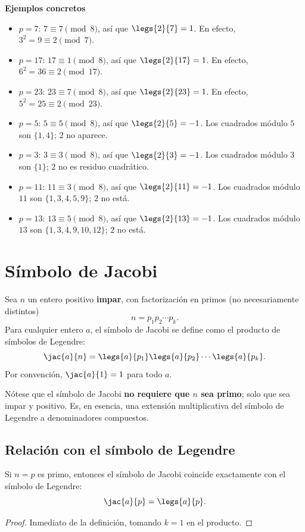 \noindent\textbf{Ejemplos concretos}

\begin{itemize}
  \item $p = 7$: $7 \equiv 7 \pmod 8$, así que $\legs{2}{7} = 1$. En efecto, $3^2 = 9 \equiv 2 \pmod 7$.
  \item $p = 17$: $17 \equiv 1 \pmod 8$, así que $\legs{2}{17} = 1$. En efecto, $6^2 = 36 \equiv 2 \pmod{17}$.
  \item $p = 23$: $23 \equiv 7 \pmod 8$, así que $\legs{2}{23} = 1$. En efecto, $5^2 = 25 \equiv 2 \pmod{23}$.
  \item $p = 5$: $5 \equiv 5 \pmod 8$, así que $\legs{2}{5} = -1$. Los cuadrados módulo $5$ son $\{1,4\}$; $2$ no aparece.
  \item $p = 3$: $3 \equiv 3 \pmod 8$, así que $\legs{2}{3} = -1$. Los cuadrados módulo $3$ son $\{1\}$; $2$ no es residuo cuadrático.
  \item $p = 11$: $11 \equiv 3 \pmod 8$, así que $\legs{2}{11} = -1$. Los cuadrados módulo $11$ son $\{1,3,4,5,9\}$; $2$ no está.
  \item $p = 13$: $13 \equiv 5 \pmod 8$, así que $\legs{2}{13} = -1$. Los cuadrados módulo $13$ son $\{1,3,4,9,10,12\}$; $2$ no está.
\end{itemize}

\section{Símbolo de Jacobi}

\begin{definicion}
Sea $n$ un entero positivo \textbf{impar}, con factorización en primos (no necesariamente distintos)
\[
n=p_1p_2\cdots p_k .
\]
Para cualquier entero $a$, el símbolo de Jacobi se define como el producto de símbolos de Legendre:
\[
\jac{a}{n}=\legs{a}{p_1}\legs{a}{p_2}\cdots\legs{a}{p_k}.
\]
Por convención, $\jac{a}{1}=1$ para todo $a$.
\end{definicion}

Nótese que el símbolo de Jacobi \textbf{no requiere que $n$ sea primo}; solo que sea impar y positivo. Es, en esencia, una extensión multiplicativa del símbolo de Legendre a denominadores compuestos.

\subsection{Relación con el símbolo de Legendre}

\begin{proposicion}
Si $n=p$ es primo, entonces el símbolo de Jacobi coincide exactamente con el símbolo de Legendre:
\[
\jac{a}{p}=\legs{a}{p}.
\]
\end{proposicion}
\begin{proof}
Inmediato de la definición, tomando $k=1$ en el producto.
\end{proof}

